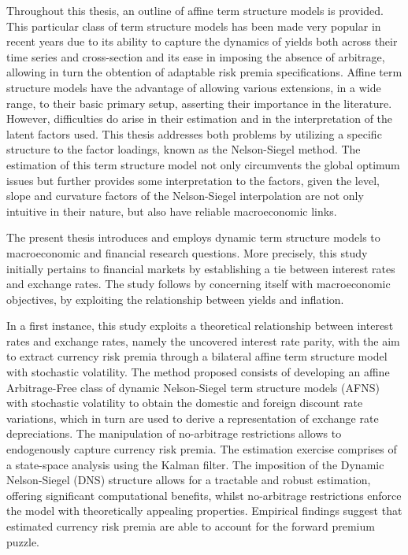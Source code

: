 Throughout this thesis, an outline of affine term structure models is provided. This particular class of term structure models has been made very popular in recent years due to its ability to capture the dynamics of yields both across their time series and cross-section and its ease in imposing the absence of arbitrage, allowing in turn the obtention of adaptable risk premia specifications. Affine term structure models have the advantage of allowing various extensions, in a wide range, to their basic primary setup, asserting their importance in the literature. However, difficulties do arise in their estimation and in the interpretation of the latent factors used. This thesis addresses both problems by utilizing a specific structure to the factor loadings, known as the Nelson-Siegel method. The estimation of this term structure model not only circumvents the global optimum issues but further provides some interpretation to the factors, given the level, slope and curvature factors of the Nelson-Siegel interpolation are not only intuitive in their nature, but also have reliable macroeconomic links.

The present thesis introduces and employs dynamic term structure models to macroeconomic and financial research questions. More precisely, this study initially pertains to financial markets by establishing a tie between interest rates and exchange rates. The study follows by concerning itself with macroeconomic objectives, by exploiting the relationship between yields and inflation.

In a first instance, this study exploits a theoretical relationship between interest rates and exchange rates, namely the uncovered interest rate parity, with the aim to extract currency risk premia through a bilateral affine term structure model with stochastic volatility. The method proposed consists of developing an affine Arbitrage-Free class of dynamic Nelson-Siegel term structure models (AFNS) with stochastic volatility to obtain the domestic and foreign discount rate variations, which in turn are used to derive a representation of exchange rate depreciations. The manipulation of no-arbitrage restrictions allows to endogenously capture currency risk premia. The estimation exercise comprises of a state-space analysis using the Kalman filter. The imposition of the Dynamic Nelson-Siegel (DNS) structure allows for a tractable and robust estimation, offering significant computational benefits, whilst no-arbitrage restrictions enforce the model with theoretically appealing properties. Empirical findings suggest that estimated currency risk premia are able to account for the forward premium puzzle. 

